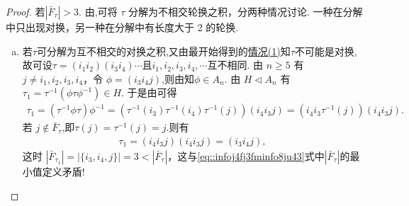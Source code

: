 \documentclass[../../main.tex]{subfiles}%
\begin{document}
\begin{proof}
若\( |\bar{F}_\tau| > 3 \). 由,可将 \( \tau \) 分解为不相交轮换之积，分两种情况讨论. 一种在分解中只出现对换，另一种在分解中有长度大于 2 的轮换.
\begin{enumerate}[(a)]
\item 若$\tau$可分解为互不相交的对换之积,又由最开始得到的\hyperref[theorem:A_n是非Abel有限单群-证明-情况1]{情况(1)}知$\tau$不可能是对换,故可设\( \tau = (i_1i_2)(i_3i_4)\cdots \)且$i_1,i_2,i_3,i_4,\cdots$互不相同. 由 \( n \geqslant 5 \) 有 \( j \neq i_1, i_2, i_3, i_4 \)，令 \( \phi = (i_3i_4j) \),则由知$\phi \in A_n$. 由 \( H \lhd A_n \) 有 \( \tau_1 = \tau^{-1}(\phi\tau\phi^{-1}) \in H \). 于是由可得
\begin{align*}
\tau_1 = (\tau^{-1}\phi\tau)\phi^{-1} = (\tau^{-1}(i_3)\tau^{-1}(i_4)\tau^{-1}(j))(i_4i_3j)=(i_4i_3\tau^{-1}(j))(i_4i_3j).
\end{align*}
若 \( j \notin \bar{F}_\tau \),即$\tau(j)=\tau^{-1}(j)=j$.则有
\begin{align*}
\tau_1 = (i_4i_3j)(i_4i_3j) = (i_3i_4j),
\end{align*}
这时 \( |\bar{F}_{\tau_1}| = |\{i_3, i_4, j\}| = 3 < |\bar{F}_\tau| \)，这与\eqref{eq::infoj4fj3fminfo8ju43}式中$|\bar{F}_\tau|$的最小值定义矛盾! 


\end{enumerate}
\end{proof}
\end{document}
